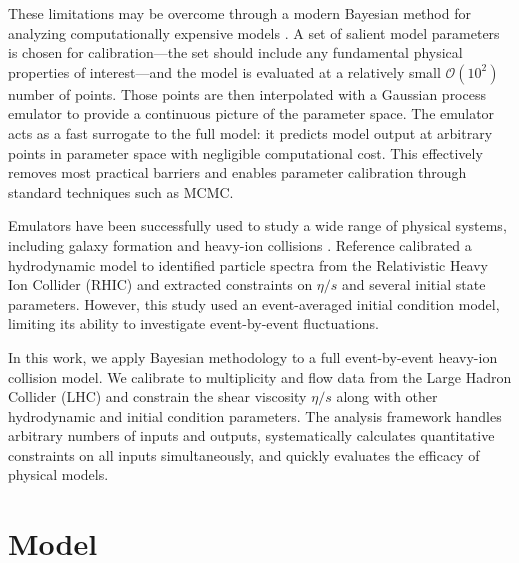 \documentclass[aps,prc,reprint,superscriptaddress,amsmath]{revtex4-1}
\newcommand{\order}[1]{$\mathcal O(10^{#1})$}
\begin{document}
These limitations may be overcome through a modern Bayesian method for analyzing computationally expensive models \cite{OHagan:2006ba,Higdon:2008cmc,Higdon:2014tva}.
A set of salient model parameters is chosen for calibration---the set should include any fundamental physical properties of interest---and the model is evaluated at a relatively small \order 2 number of points.
Those points are then interpolated with a Gaussian process emulator \cite{Rasmussen:2006gp} to provide a continuous picture of the parameter space.
The emulator acts as a fast surrogate to the full model:
it predicts model output at arbitrary points in parameter space with negligible computational cost.
This effectively removes most practical barriers and enables parameter calibration through standard techniques such as MCMC.

Emulators have been successfully used to study a wide range of physical systems, including galaxy formation \cite{Gomez:2012ak} and heavy-ion collisions \cite{Novak:2013bqa,Pratt:2014cza,Pratt:2015zsa}.
Reference \cite{Novak:2013bqa} calibrated a hydrodynamic model to identified particle spectra from the Relativistic Heavy Ion Collider (RHIC) and extracted constraints on $\eta/s$ and several initial state parameters.
However, this study used an event-averaged initial condition model, limiting its ability to investigate event-by-event fluctuations.

In this work, we apply Bayesian methodology to a full event-by-event heavy-ion collision model.
We calibrate to multiplicity and flow data from the Large Hadron Collider (LHC) and constrain the shear viscosity $\eta/s$ along with other hydrodynamic and initial condition parameters.
The analysis framework handles arbitrary numbers of inputs and outputs, systematically calculates quantitative constraints on all inputs simultaneously, and quickly evaluates the efficacy of physical models.


\section{Model}
\end{document}
